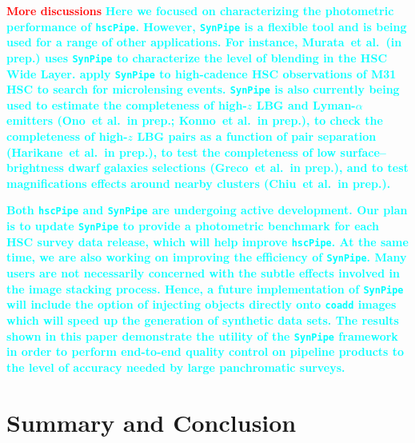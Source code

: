\documentclass[useamsfonts]{pasj01}
\def\etal{{\ et al.~}}
\def\hscpipe{\texttt{hscPipe}}
\def\synpipe{\texttt{SynPipe}}
\def\coadd{\texttt{coadd}}
\newcommand{\todo}[1]{\textcolor{red} {\textbf{#1}}}
\newcommand{\song}[1]{\textcolor{cyan} {\textbf{#1}}}
\begin{document}
    \todo{More discussions}
    \song{
    Here we focused on characterizing the photometric performance of \hscpipe{}.  
    However, \synpipe{} is a flexible tool and is being used for a range of other     
    applications. 
    For instance, Murata\etal (in prep.) uses \synpipe{} to characterize the level of
    blending in the HSC Wide Layer.  
    \citep{Niikura2017} apply \synpipe{} to high-cadence HSC observations of M31 HSC 
    to search for microlensing events. 
    \synpipe{} is also currently being used to estimate the completeness of high-$z$ 
    LBG and Lyman-$\alpha$ emitters (Ono\etal in prep.; Konno\etal in prep.), to 
    check the completeness of high-$z$ LBG pairs as a function of pair separation 
    (Harikane\etal in prep.), to test the completeness of low surface--brightness 
    dwarf galaxies selections (Greco\etal in prep.), and to test magnifications effects
    around nearby clusters (Chiu\etal in prep.).
    }

    \song{
    Both \hscpipe{} and \synpipe{} are undergoing active development. 
    Our plan is to update \synpipe{} to provide a photometric benchmark for
    each HSC survey data release, which will help improve \hscpipe{}.
    At the same time, we are also working on improving the efficiency of \synpipe{}.
    Many users are not necessarily concerned with the subtle effects involved in 
    the image stacking process. 
    Hence, a future implementation of \synpipe{} will include the option of injecting 
    objects directly onto \coadd{} images which will speed up the generation of 
    synthetic data sets. 
    The results shown in this paper demonstrate the utility of the \synpipe{} framework
    in order to perform end-to-end quality control on pipeline products to the level 
    of accuracy needed by large panchromatic surveys. 
    }

    

\section{Summary and Conclusion}
    \label{sec:summary}
\end{document}
